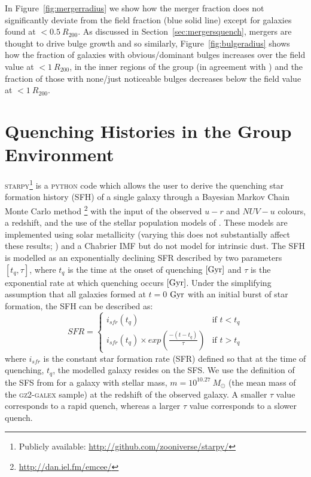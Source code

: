 \documentclass[useAMS,usenatbib]{mn2e}
\begin{document}
In Figure~\ref{fig:mergerradius} we show how the merger fraction does not significantly deviate from the field fraction (blue solid line) except for galaxies found at $< 0.5~R_{200}$. As discussed in Section~\ref{sec:mergersquench}, mergers are thought to drive bulge growth and so similarly, Figure~\ref{fig:bulgeradius} shows how the fraction of galaxies with obvious/dominant bulges increases over the field value at $< 1~R_{200}$, in the inner regions of the group (in agreement with \citealt{diaferio01}) and the fraction of those with none/just noticeable bulges decreases below the field value at $< 1~R_{200}$. 


\section{Quenching Histories in the Group Environment}\label{sec:starpy}

\textsc{starpy}\footnote{Publicly available: \url{http://github.com/zooniverse/starpy/}} is a \textsc{python} code which allows the user to derive the quenching star formation history (SFH) of a single galaxy through a Bayesian Markov Chain Monte Carlo method \citep{emcee13}\footnote{\url{http://dan.iel.fm/emcee/}} with the input of the observed $u-r$ and $NUV-u$ colours, a redshift, and the use of the stellar population models of \cite{BC03}. These models are implemented using solar metallicity (varying this does not substantially affect these results; \citealt{smethurst15}) and a Chabrier IMF \citep{chabrier03} but do not model for intrinsic dust. The SFH is modelled as an exponentially declining SFR described by two parameters $[t_{q}, \tau]$, where $t_{q}$ is the time at the onset of quenching $\rm{[Gyr]}$ and $\tau$ is the exponential rate at which quenching occurs $\rm{[Gyr]}$. Under the simplifying assumption that all galaxies formed at $t=0$ $\rm{ Gyr}$ with an initial burst of star formation, the SFH can be described as: 
\begin{equation}\label{sfh}
SFR =
\begin{cases}
i_{sfr}(t_{q}) & \text{if } t < t_{q} \\
i_{sfr}(t_{q}) \times exp{\left( \frac{-(t-t_{q})}{\tau}\right)} & \text{if } t > t_{q} 
\end{cases}
\end{equation}
where $i_{sfr}$ is the constant star formation rate (SFR) defined so that at the time of quenching, $t_{q}$, the modelled galaxy resides on the SFS. We use the definition of the SFS from \cite{peng10} for a galaxy with stellar mass, $m = 10^{10.27}~M_{\odot}$ (the mean mass of the \textsc{gz2-galex} sample) at the redshift of the observed galaxy.  A smaller $\tau$ value corresponds to a rapid quench, whereas a larger $\tau$ value corresponds to a slower quench. 
\end{document}
